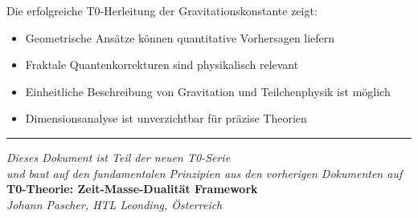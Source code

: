 \documentclass[12pt,a4paper]{article}
\begin{document}
	Die erfolgreiche T0-Herleitung der Gravitationskonstante zeigt:
	\begin{itemize}
		\item Geometrische Ansätze können quantitative Vorhersagen liefern
		\item Fraktale Quantenkorrekturen sind physikalisch relevant
		\item Einheitliche Beschreibung von Gravitation und Teilchenphysik ist möglich
		\item Dimensionsanalyse ist unverzichtbar für präzise Theorien
	\end{itemize}
	
	\begin{center}
		\hrule
		\vspace{0.5cm}
		\textit{Dieses Dokument ist Teil der neuen T0-Serie}\\
		\textit{und baut auf den fundamentalen Prinzipien aus den vorherigen Dokumenten auf}\\
		\vspace{0.3cm}
		\textbf{T0-Theorie: Zeit-Masse-Dualität Framework}\\
		\textit{Johann Pascher, HTL Leonding, Österreich}\\
	\end{center}
	
\end{document}
